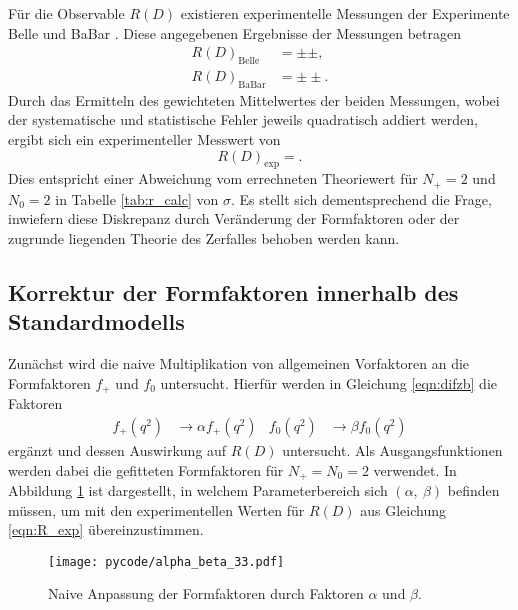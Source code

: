 Für die Observable $R(D)$ existieren experimentelle Messungen der Experimente Belle \cite{PhysRevD.92.072014} und BaBar \cite{PhysRevLett.109.101802}.
Diese angegebenen Ergebnisse der Messungen betragen
\begin{align*}
  R(D)_\text{Belle} &=  \pm  \pm  ,\\
  R(D)_\text{BaBar} &=  \pm  \pm .
\end{align*}
Durch das Ermitteln des gewichteten Mittelwertes der beiden Messungen, wobei der systematische und statistische Fehler jeweils quadratisch addiert werden, ergibt sich ein experimenteller Messwert von
\begin{equation}
  \label{eqn:R_exp}
  R(D)_\text{exp} = .
\end{equation}
Dies entspricht einer Abweichung vom errechneten Theoriewert für $N_+=\num{2}$ und $N_0=\num{2}$ in Tabelle \ref{tab:r_calc} von $\sigma$.
Es stellt sich dementsprechend die Frage, inwiefern diese Diskrepanz durch Veränderung der Formfaktoren oder der zugrunde liegenden Theorie des Zerfalles behoben werden kann.

\subsection{Korrektur der Formfaktoren innerhalb des Standardmodells}
\label{sec:naiv}
Zunächst wird die naive Multiplikation von allgemeinen Vorfaktoren an die Formfaktoren $f_+$ und $f_0$ untersucht.
Hierfür werden in Gleichung \eqref{eqn:difzb} die Faktoren
\begin{align*}
  f_+(q^2) &\to \alpha f_+(q^2) & f_0(q^2) &\to \beta f_0(q^2)
\end{align*}
ergänzt und dessen Auswirkung auf $R(D)$ untersucht.
Als Ausgangsfunktionen werden dabei die gefitteten Formfaktoren für $N_+ = N_0 = \num{2}$ verwendet.
In Abbildung \ref{fig:alpha_beta} ist dargestellt, in welchem Parameterbereich sich $(\alpha, \: \beta)$ befinden müssen, um mit den experimentellen Werten für $R(D)$ aus Gleichung \eqref{eqn:R_exp} übereinzustimmen.
\begin{figure}
  \centering
  \texttt{[image: pycode/alpha\_beta\_33.pdf]}
  \caption{Naive Anpassung der Formfaktoren durch Faktoren $\alpha$ und $\beta$.}
  \label{fig:alpha_beta}
\end{figure}

